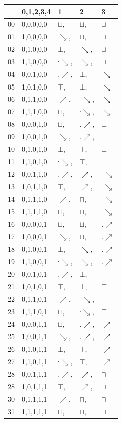 \documentclass[10pt,journal]{IEEEtran}
\begin{document}
\begin{table}[H]
\begin{tabular}{|p{.5cm}|p{1.5cm}|p{1cm} p{1cm} p{1cm}|}&0,1,2,3,4 &1 &2 &3 \\ \hline 00&0,0,0,0,0 &$\sqcup$,&$\sqcup$,&$\sqcup$ \\ \hline 01&1,0,0,0,0 &$\searrow$,&$\sqcup$,&$\sqcup$ \\ \hline 02&0,1,0,0,0 &$\bot$,&$\searrow$,&$\sqcup$ \\ \hline 03&1,1,0,0,0 &$^.\searrow$,&$\searrow$,&$\sqcup$ \\ \hline 04&0,0,1,0,0 &$.\nearrow$,&$\bot$,&$\searrow$ \\ \hline 05&1,0,1,0,0 &$\top$,&$\bot$,&$\searrow$ \\ \hline 06&0,1,1,0,0 &$\nearrow$,&$^.\searrow$,&$\searrow$ \\ \hline 07&1,1,1,0,0 &$\sqcap$,&$^.\searrow$,&$\searrow$ \\ \hline 08&0,0,0,1,0 &$\sqcup$,&$.\nearrow$,&$\bot$ \\ \hline 09&1,0,0,1,0 &$\searrow$,&$.\nearrow$,&$\bot$ \\ \hline 10&0,1,0,1,0 &$\bot$,&$\top$,&$\bot$ \\ \hline 11&1,1,0,1,0 &$^.\searrow$,&$\top$,&$\bot$ \\ \hline 12&0,0,1,1,0 &$.\nearrow$,&$\nearrow$,&$^.\searrow$ \\ \hline 13&1,0,1,1,0 &$\top$,&$\nearrow$,&$^.\searrow$ \\ \hline 14&0,1,1,1,0 &$\nearrow$,&$\sqcap$,&$^.\searrow$ \\ \hline 15&1,1,1,1,0 &$\sqcap$,&$\sqcap$,&$^.\searrow$ \\ \hline 16&0,0,0,0,1 &$\sqcup$,&$\sqcup$,&$.\nearrow$ \\ \hline 17&1,0,0,0,1 &$\searrow$,&$\sqcup$,&$.\nearrow$ \\ \hline 18&0,1,0,0,1 &$\bot$,&$\searrow$,&$.\nearrow$ \\ \hline 19&1,1,0,0,1 &$^.\searrow$,&$\searrow$,&$.\nearrow$ \\ \hline 20&0,0,1,0,1 &$.\nearrow$,&$\bot$,&$\top$ \\ \hline 21&1,0,1,0,1 &$\top$,&$\bot$,&$\top$ \\ \hline 22&0,1,1,0,1 &$\nearrow$,&$^.\searrow$,&$\top$ \\ \hline 23&1,1,1,0,1 &$\sqcap$,&$^.\searrow$,&$\top$ \\ \hline 24&0,0,0,1,1 &$\sqcup$,&$.\nearrow$,&$\nearrow$ \\ \hline 25&1,0,0,1,1 &$\searrow$,&$.\nearrow$,&$\nearrow$ \\ \hline 26&0,1,0,1,1 &$\bot$,&$\top$,&$\nearrow$ \\ \hline 27&1,1,0,1,1 &$^.\searrow$,&$\top$,&$\nearrow$ \\ \hline 28&0,0,1,1,1 &$.\nearrow$,&$\nearrow$,&$\sqcap$ \\ \hline 28&1,0,1,1,1 &$\top$,&$\nearrow$,&$\sqcap$ \\ \hline 30&0,1,1,1,1 &$\nearrow$,&$\sqcap$,&$\sqcap$ \\ \hline 31&1,1,1,1,1 &$\sqcap$,&$\sqcap$,&$\sqcap$ \\ \hline \end{tabular} \end{table} 
\end{document}

